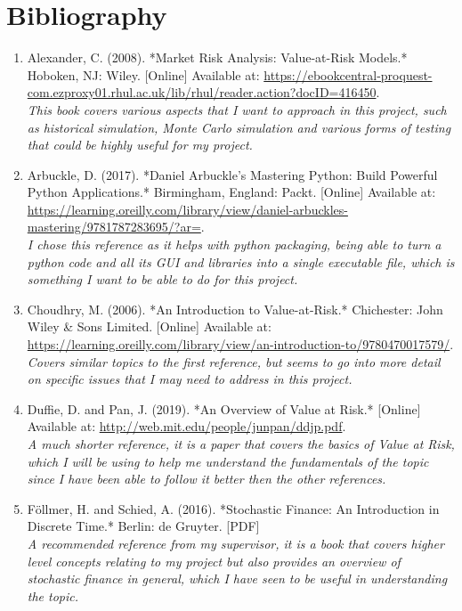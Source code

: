 \documentclass{article}
\begin{document}
\section{Bibliography}
\begin{small}
\begin{enumerate}
  \item\label{ref1} Alexander, C. (2008). *Market Risk Analysis: Value-at-Risk Models.* Hoboken, NJ: Wiley. [Online] Available at: \url{https://ebookcentral-proquest-com.ezproxy01.rhul.ac.uk/lib/rhul/reader.action?docID=416450}.
  \\\textit{This book covers various aspects that I want to approach in this project, such as historical simulation, Monte Carlo simulation and various forms of testing that could be highly useful for my project.}
  
  \item\label{ref2} Arbuckle, D. (2017). *Daniel Arbuckle’s Mastering Python: Build Powerful Python Applications.* Birmingham, England: Packt. [Online] Available at: \url{https://learning.oreilly.com/library/view/daniel-arbuckles-mastering/9781787283695/?ar=}.
  \\\textit{I chose this reference as it helps with python packaging, being able to turn a python code and all its GUI and libraries into a single executable file, which is something I want to be able to do for this project.}

  \item\label{ref3} Choudhry, M. (2006). *An Introduction to Value-at-Risk.* Chichester: John Wiley \& Sons Limited. [Online] Available at: \\ \url{https://learning.oreilly.com/library/view/an-introduction-to/9780470017579/}.
  \\\textit{Covers similar topics to the first reference, but seems to go into more detail on specific issues that I may need to address in this project.}
  
  \item\label{ref4} Duffie, D. and Pan, J. (2019). *An Overview of Value at Risk.* [Online] Available at: \url{http://web.mit.edu/people/junpan/ddjp.pdf}.
  \\\textit{A much shorter reference, it is a paper that covers the basics of Value at Risk, which I will be using to help me understand the fundamentals of the topic since I have been able to follow it better then the other references.}
  
  \item\label{ref5} Föllmer, H. and Schied, A. (2016). *Stochastic Finance: An Introduction in Discrete Time.* Berlin: de Gruyter. [PDF]
  \\\textit{A recommended reference from my supervisor, it is a book that covers higher level concepts relating to my project but also provides an overview of stochastic finance in general, which I have seen to be useful in understanding the topic.}
  

\end{enumerate}
\end{small}
\end{document}
